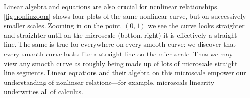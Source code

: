 Linear algebra and equations are also crucial for nonlinear relationships.
\autoref{fig:nonlinzoom} shows four plots of the same nonlinear curve, but on successively smaller scales.
Zooming in on the point~\((0,1)\) we see the curve looks straighter and straighter until on the microscale (bottom-right) it is effectively a straight line.
The same is true for everywhere on every smooth curve: we discover that every smooth curve looks like a straight line on the microscale. 
Thus we may view any smooth curve as roughly being made up of lots of microscale straight line segments.
Linear equations and their algebra on this microscale empower our understanding of nonlinear relations---for example, microscale linearity underwrites all of calculus.
 




\endinput





